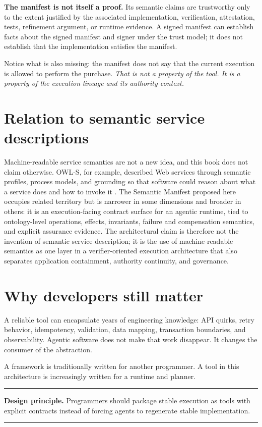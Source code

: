 \documentclass[10pt,oneside,openany]{book}
\newcommand{\principle}[1]{%
  \vspace{4pt}
  \noindent\begin{minipage}{\linewidth}
  \hrule\vspace{5pt}
  \small\sffamily\raggedright\textbf{Design principle.} #1
  \vspace{5pt}\hrule
  \end{minipage}\vspace{4pt}
}
\begin{document}
\textbf{The manifest is not itself a proof.} Its semantic claims are trustworthy only to the extent justified by the associated implementation, verification, attestation, tests, refinement argument, or runtime evidence. A signed manifest can establish facts about the signed manifest and signer under the trust model; it does not establish that the implementation satisfies the manifest.

Notice what is also missing: the manifest does not say that the current execution is allowed to perform the purchase. \emph{That is not a property of the tool. It is a property of the execution lineage and its authority context.}

\section{Relation to semantic service descriptions}
Machine-readable service semantics are not a new idea, and this book does not claim otherwise. OWL-S, for example, described Web services through semantic profiles, process models, and grounding so that software could reason about what a service does and how to invoke it \cite{owls2004}. The Semantic Manifest proposed here occupies related territory but is narrower in some dimensions and broader in others: it is an execution-facing contract surface for an agentic runtime, tied to ontology-level operations, effects, invariants, failure and compensation semantics, and explicit assurance evidence. The architectural claim is therefore not the invention of semantic service description; it is the use of machine-readable semantics as one layer in a verifier-oriented execution architecture that also separates application containment, authority continuity, and governance.

\section{Why developers still matter}
A reliable tool can encapsulate years of engineering knowledge: API quirks, retry behavior, idempotency, validation, data mapping, transaction boundaries, and observability. Agentic software does not make that work disappear. It changes the consumer of the abstraction.

A framework is traditionally written for another programmer. A tool in this architecture is increasingly written for a runtime and planner.

\principle{Programmers should package stable execution as tools with explicit contracts instead of forcing agents to regenerate stable implementation.}
\end{document}
